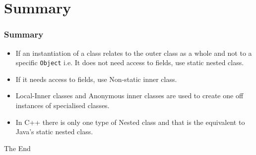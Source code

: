 \documentclass{beamer}
\begin{document}
\section{Summary}
\begin{frame}
\frametitle{Summary}
\begin{itemize}
\item If an instantiation of a class relates to the outer class as a whole and not to a specific \texttt{Object} i.e. It does not need access to fields, use {\color{green}static nested class}.
\item If it needs access to fields, use {\color{red} Non-static inner class}.
\item {\color{brown} Local-Inner classes} and {\color{magenta} Anonymous inner classes} are used to create one off instances of specialised classes.
\item In C++ there is only one type of Nested class and that is the equivalent to Java's {\color{green}static nested class}.
\end{itemize}
\end{frame}
\begin{frame}
\Huge{\centerline{The End}}
\end{frame}
\end{document}
